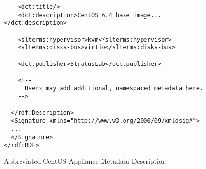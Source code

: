\begin{figure}
\begin{center}
\begin{verbatim}
    <dct:title/>
    <dct:description>CentOS 6.4 base image...</dct:description>
    
    <slterms:hypervisor>kvm</slterms:hypervisor>
    <slterms:disks-bus>virtio</slterms:disks-bus>
    
    <dct:publisher>StratusLab</dct:publisher>

    <!--
      Users may add additional, namespaced metadata here. 
    -->    
    
  </rdf:Description>
  <Signature xmlns="http://www.w3.org/2000/09/xmldsig#">
  ...
  </Signature>
</rdf:RDF>
\end{verbatim}
\end{center}
\caption{Abbreviated CentOS Appliance Metadata Description}
\label{fig:metadata-example}
\end{figure}
